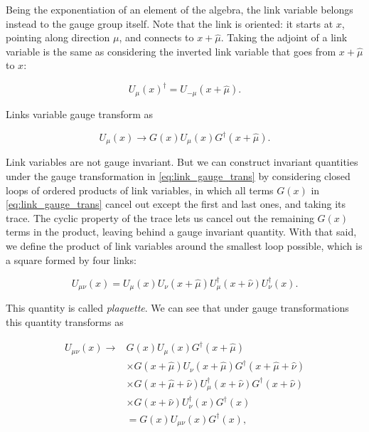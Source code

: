 \documentclass[reqno,12pt]{article}
\numberwithin{equation}{section}
\begin{document}
Being the exponentiation of an element of the algebra, the link variable belongs instead to the gauge group itself.
Note that the link is oriented: it starts at $x$, pointing along direction $\mu$, and connects to $x + \hat{\mu}$. Taking
the adjoint of a link variable is the same as considering the inverted link variable that goes from $x + \hat{\mu}$ to $x$:

\begin{equation}
	U_\mu(x)^\dagger = U_{-\mu}(x + \hat{\mu}).
\end{equation}

Links variable gauge transform as

\begin{equation} \label{eq:link_gauge_trans}
	U_\mu(x) \rightarrow G(x) U_\mu(x) G^\dagger(x + \hat{\mu}).
\end{equation}

Link variables are not gauge invariant. But we can construct invariant quantities under the gauge transformation in \eqref{eq:link_gauge_trans}
by considering closed loops of
ordered products of link variables, in which all terms $G(x)$ in \eqref{eq:link_gauge_trans} cancel out except the first and
last ones, and taking its trace. The cyclic property of the trace lets us cancel out the remaining $G(x)$ terms in the product,
leaving behind a gauge invariant quantity. With that said, we define the product of link variables around the smallest
loop possible, which is a square formed by four links:

\begin{equation} \label{eq:plaquette}
	U_{\mu\nu}(x) = U_\mu(x) U_\nu(x + \hat{\mu}) U_\mu^\dagger(x + \hat{\nu}) U_\nu^\dagger(x).
\end{equation}

This quantity is called \textit{plaquette}. We can see that under gauge transformations this quantity transforms as

\begin{equation} \label{eq:plaq_gauge_trans}
	\begin{aligned}
		U_{\mu\nu}(x) \rightarrow &G(x) U_\mu(x) G^\dagger(x + \hat{\mu}) \\ 
			&\times G(x + \hat{\mu}) U_\nu(x + \hat{\mu}) G^\dagger(x + \hat{\mu} + \hat{\nu})  \\
			&\times G(x + \hat{\mu} + \hat{\nu}) U_\mu^\dagger(x + \hat{\nu}) G^\dagger(x + \hat{\nu})  \\
			&\times G(x + \hat{\nu}) U_\nu^\dagger(x) G^\dagger(x) \\
			&= G(x) U_{\mu\nu}(x) G^\dagger(x),
	\end{aligned}	
\end{equation}
\end{document}
